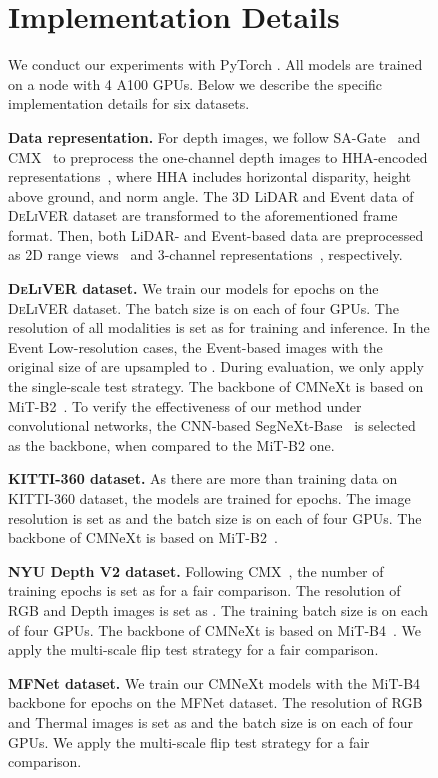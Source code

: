 \documentclass[10pt,twocolumn,letterpaper]{article}
\begin{document}
\begin{figure}[!t]
{\section{Implementation Details}
We conduct our experiments with PyTorch . All models are trained on a node with 4 A100 GPUs. Below we describe the specific implementation details for six datasets. 

\noindent\textbf{Data representation.}
For depth images, we follow SA-Gate~\cite{chen2020sagate} and CMX~\cite{liu2022cmx} to preprocess the one-channel depth images to HHA-encoded representations~\cite{gupta2014learning}, where HHA includes horizontal disparity, height above ground, and norm angle. The 3D LiDAR and Event data of \textsc{DeLiVER} dataset are transformed to the aforementioned frame format. Then, both LiDAR- and Event-based data are preprocessed as 2D range views~\cite{zhuang2021pmf} and 3-channel representations~\cite{zhang2021issafe}, respectively. 

\noindent\textbf{\textsc{DeLiVER} dataset.} 
We train our models for  epochs on the \textsc{DeLiVER} dataset. The batch size is  on each of four GPUs. The resolution of all modalities is set as  for training and inference. In the Event Low-resolution cases, the Event-based images with the original size of  are upsampled to . During evaluation, we only apply the single-scale test strategy. The backbone of CMNeXt is based on MiT-B2~\cite{xie2021segformer}. To verify the effectiveness of our method under convolutional networks, the CNN-based SegNeXt-Base~\cite{guo2022segnext} is selected as the backbone, when compared to the MiT-B2 one.

\noindent\textbf{KITTI-360 dataset.} As there are more than  training data on KITTI-360 dataset, the models are trained for  epochs. The image resolution is set as  and the batch size is  on each of four GPUs. The backbone of CMNeXt is based on MiT-B2~\cite{xie2021segformer}. 

\noindent\textbf{NYU Depth V2 dataset.} Following CMX~\cite{liu2022cmx}, the number of training epochs is set as  for a fair comparison. The resolution of RGB and Depth images is set as . The training batch size is  on each of four GPUs. The backbone of CMNeXt is based on MiT-B4~\cite{xie2021segformer}. We apply the multi-scale flip test strategy for a fair comparison.

\noindent\textbf{MFNet dataset.} We train our CMNeXt models with the MiT-B4 backbone for  epochs on the MFNet dataset. The resolution of RGB and Thermal images is set as  and the batch size is  on each of four GPUs. We apply the multi-scale flip test strategy for a fair comparison.

}
\end{figure}
\end{document}
